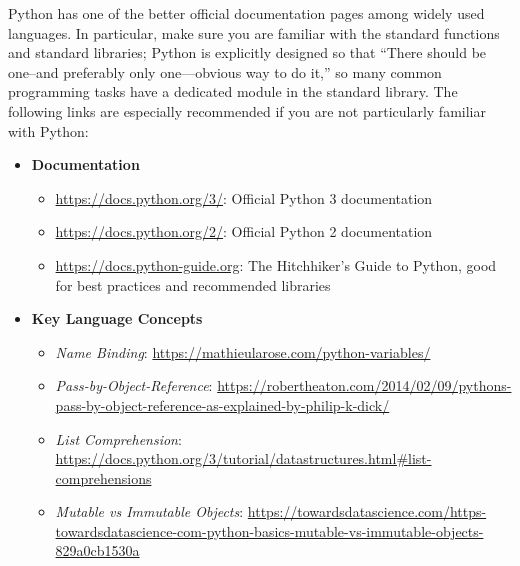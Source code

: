 \documentclass[12pt]{article}
\begin{document}
Python has one of the better official documentation pages among widely used languages. In particular, make sure you are familiar with the standard functions and standard libraries; Python is explicitly designed so that ``There should be one--and preferably only one---obvious way to do it,'' so many common programming tasks have a dedicated module in the standard library. The following links are especially recommended if you are not particularly familiar with Python:
\begin{itemize}
    \item \textbf{Documentation}
        \begin{itemize}
            \item \url{https://docs.python.org/3/}: Official Python 3 documentation
            \item \url{https://docs.python.org/2/}: Official Python 2 documentation
            \item \url{https://docs.python-guide.org}: The Hitchhiker's Guide to Python, good for best practices and recommended libraries
        \end{itemize}
    \item \textbf{Key Language Concepts}
        \begin{itemize}
            \item \textit{Name Binding}: \url{https://mathieularose.com/python-variables/}
            \item \textit{Pass-by-Object-Reference}: \url{https://robertheaton.com/2014/02/09/pythons-pass-by-object-reference-as-explained-by-philip-k-dick/}
            \item \textit{List Comprehension}: \url{https://docs.python.org/3/tutorial/datastructures.html#list-comprehensions}
            \item \textit{Mutable vs Immutable Objects}: \url{https://towardsdatascience.com/https-towardsdatascience-com-python-basics-mutable-vs-immutable-objects-829a0cb1530a}
        \end{itemize}
\end{itemize}
\end{document}
